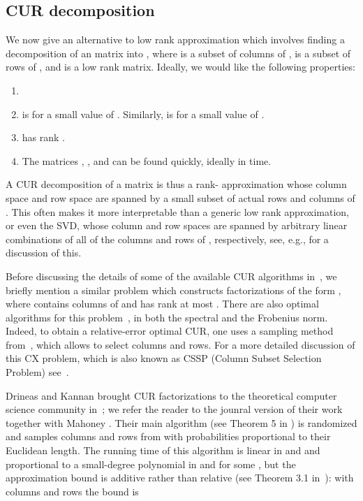 \documentclass[11pt]{article}
\begin{document}
\subsection{CUR decomposition}\label{sec:CUR}
We now give an alternative to low rank approximation which involves finding a decomposition of an  matrix 
into , where  is a subset of columns of ,  is a subset of rows of 
, and  is a low rank matrix. 
Ideally, we would like the following properties:
\begin{enumerate}
\item 
\item  is  for a small value of . Similarly,  is  for a small value of .
\item  has rank .
\item The matrices , , and  can be found quickly, ideally in  time. 
\end{enumerate}
A CUR decomposition of a matrix is thus a rank- approximation whose column space and row space are spanned by a small subset of 
actual rows and columns
of . This often makes it more interpretable than a generic low rank approximation, or even the SVD, whose column and row spaces are
spanned by arbitrary linear combinations of all of the columns and rows of , respectively, see, e.g., \cite{MD09} for a discussion
of this. 

Before discussing the details of some of the available CUR algorithms in~\cite{DK03,DKM06c,DMM08,DM09,GM13,WZ13CUR,BW14}, we briefly mention a 
similar problem
which constructs factorizations of the form , where  contains columns of  and  has rank at
most . There are also optimal algorithms for this problem~\cite{BDM11a,GS12}, in both the spectral and the Frobenius norm. Indeed, to
obtain a relative-error optimal CUR, one uses a sampling method from~\cite{BDM11a}, which allows to select  columns and rows.
For a more detailed discussion of this CX problem, which is also known as CSSP (Column Subset Selection Problem) see~\cite{BMD09a,BDM11a,GS12}.

Drineas and Kannan brought CUR factorizations to the theoretical computer science community in~\cite{DK03}; we
refer the reader to the jounral version of their work together with Mahoney \cite{DKM06c}. 
Their main algorithm (see Theorem 5 in \cite{DKM06c}) 
is randomized and samples columns and rows from  with probabilities proportional
to their Euclidean length. The running time of this algorithm is linear in  and  and proportional to a
small-degree polynomial in  and  for some ,
but the approximation bound is additive rather than relative 
(see Theorem 3.1 in~\cite{DK03}): with  columns and  rows
the bound is 
\end{document}
